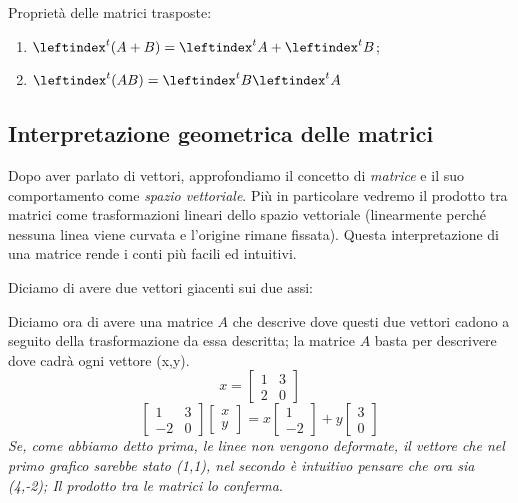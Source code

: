 \documentclass[x11names]{article}
\begin{document}
Proprietà delle matrici trasposte:
\begin{enumerate}
\item $\leftindex^t{\left(A+B\right)} = \leftindex^t{A} + \leftindex^t{B}$;
\item $\leftindex^t{(AB)} = \leftindex^t{B} \leftindex^t{A}$
\end{enumerate}

\subsection*{Interpretazione geometrica delle matrici}
Dopo aver parlato di vettori, approfondiamo il concetto di \textit{matrice} e il suo comportamento come \textit{spazio vettoriale}. Più in particolare vedremo il prodotto tra matrici come trasformazioni lineari dello spazio vettoriale (linearmente perché nessuna linea viene curvata e l'origine rimane fissata). Questa interpretazione di una matrice rende i conti più facili ed intuitivi. 

\noindent
Diciamo di avere due vettori giacenti sui due assi:

\begin{center}

\end{center}

\noindent
Diciamo ora di avere una matrice $A$ che descrive dove questi due vettori cadono a seguito della trasformazione da essa descritta; la matrice $A$ basta per descrivere dove cadrà ogni vettore (x,y). 
$$
x=\begin{bmatrix}
    1 & 3 \\
    2 & 0 
\end{bmatrix}
$$
$$
\begin{bmatrix}
   1 & 3 \\
   -2 & 0 
\end{bmatrix}
\begin{bmatrix}
    x \\
    y
\end{bmatrix}
= x
\begin{bmatrix}
    1\\-2
\end{bmatrix}
+ y
\begin{bmatrix}
    3 \\  0
\end{bmatrix}
$$
\textit{Se, come abbiamo detto prima, le linee non vengono deformate, il vettore che nel primo grafico sarebbe stato (1,1), nel secondo è intuitivo pensare che ora sia (4,-2); Il prodotto tra le matrici lo conferma}.
\end{document}
